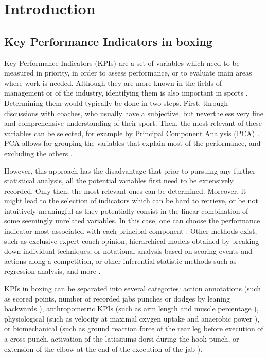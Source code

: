 \newpage






\section{Introduction}

\subsection{Key Performance Indicators in boxing}

Key Performance Indicators (KPIs) are a set of variables which need to be measured in priority, in order to assess performance, or to evaluate main areas where work is needed. Although they are more known in the fields of management or of the industry, identifying them is also important in sports \cite{Hughes2002,Butterworth2013}. Determining them would typically be done in two steps. First, through discussions with coaches, who usually have a subjective, but nevertheless very fine and comprehensive understanding of their sport. Then, the most relevant of these variables can be selected, for example by Principal Component Analysis (PCA) \cite{Hotelling1933}. PCA allows for grouping the variables that explain most of the performance, and excluding the others \cite{ODonoghue2008}.

However, this approach has the disadvantage that prior to pursuing any further statistical analysis, all the potential variables first need to be extensively recorded. Only then, the most relevant ones can be determined. Moreover, it might lead to the selection of indicators which can be hard to retrieve, or be not intuitively meaningful as they potentially consist in the linear combination of some seemingly unrelated variables. In this case, one can choose the performance indicator most associated with each principal component \cite{ODonoghue2008}. Other methods exist, such as exclusive expert coach opinion, hierarchical models obtained by breaking down individual techniques, or notational analysis based on scoring events and actions along a competition, or other inferential statistic methods such as regression analysis, and more \cite{Hughes2002,Butterworth2013}.

KPIs in boxing can be separated into several categories: action annotations (such as scored points, number of recorded jabs punches or dodges by leaning backwards \cite{Thomson2013}), anthropometric KPIs (such as arm length and muscle percentage \cite{Chaabene2015}), physiological (such as velocity at maximal oxygen uptake and anaerobic power \cite{Chaabene2015}), or biomechanical (such as ground reaction force of the rear leg before execution of a cross punch, activation of the latissiums dorsi during the hook punch, or extension of the elbow at the end of the execution of the jab \cite{Lenetsky2020}). 

